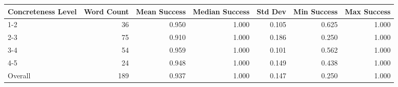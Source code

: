 \begin{tabular}{lrrrrrr}
\toprule
Concreteness Level & Word Count & Mean Success & Median Success & Std Dev & Min Success & Max Success \\
\midrule
1-2 & 36 & 0.950 & 1.000 & 0.105 & 0.625 & 1.000 \\
2-3 & 75 & 0.910 & 1.000 & 0.186 & 0.250 & 1.000 \\
3-4 & 54 & 0.959 & 1.000 & 0.101 & 0.562 & 1.000 \\
4-5 & 24 & 0.948 & 1.000 & 0.149 & 0.438 & 1.000 \\
Overall & 189 & 0.937 & 1.000 & 0.147 & 0.250 & 1.000 \\
\bottomrule
\end{tabular}
